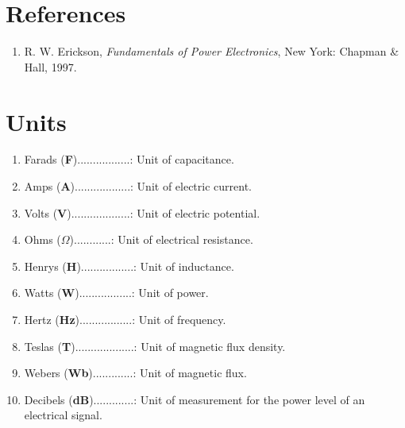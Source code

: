 \documentclass{article}
\begin{document}
\section{References}

\begin{enumerate}
    \item R. W. Erickson, \textit{Fundamentals of Power Electronics}, New York: Chapman \& Hall, 1997.
\end{enumerate}

\section{Units}

\begin{enumerate}
    \item Farads (\textbf{F}).................: Unit of capacitance.
    \item Amps (\textbf{A})..................: Unit of electric current.
    \item Volts (\textbf{V})...................: Unit of electric potential.
    \item Ohms (\textbf{$\Omega$})............: Unit of electrical resistance.
    \item Henrys (\textbf{H}).................: Unit of inductance.
    \item Watts (\textbf{W}).................: Unit of power.
    \item Hertz (\textbf{Hz}).................: Unit of frequency.
    \item Teslas (\textbf{T})...................: Unit of magnetic flux density.
    \item Webers (\textbf{Wb}).............: Unit of magnetic flux.
    \item Decibels (\textbf{dB}).............: Unit of measurement for the power level of an electrical signal.
\end{enumerate}

\end{document}
